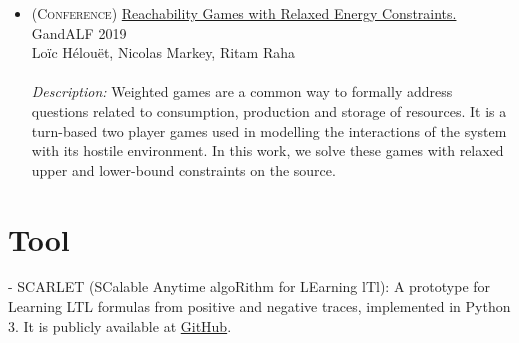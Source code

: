 \documentclass[a4paper,10pt]{article}
\begin{document}
\begin{itemize}
    
    \item \textsc{(Conference)} \href{https://dblp.org/rec/html/journals/corr/abs-1909-07653}{Reachability Games with Relaxed Energy Constraints.} GandALF 2019\\
    Loïc Hélouët, Nicolas Markey, Ritam Raha\\
    \\
    \emph{Description:} Weighted games are a common way to formally address questions related
    to consumption, production and storage of resources. It is a turn-based two player games used in modelling the interactions of the system with its hostile environment. In this work, we solve these games with relaxed upper and lower-bound constraints on the source.
\end{itemize} 


\section{Tool}
- \textsc{SCARLET} (SCalable Anytime algoRithm for LEarning lTl):  A prototype for Learning LTL formulas from positive and negative traces, implemented in Python 3. It is publicly available at \href{https://github.com/rajarshi008/Scarlet}{GitHub}.
\end{document}
